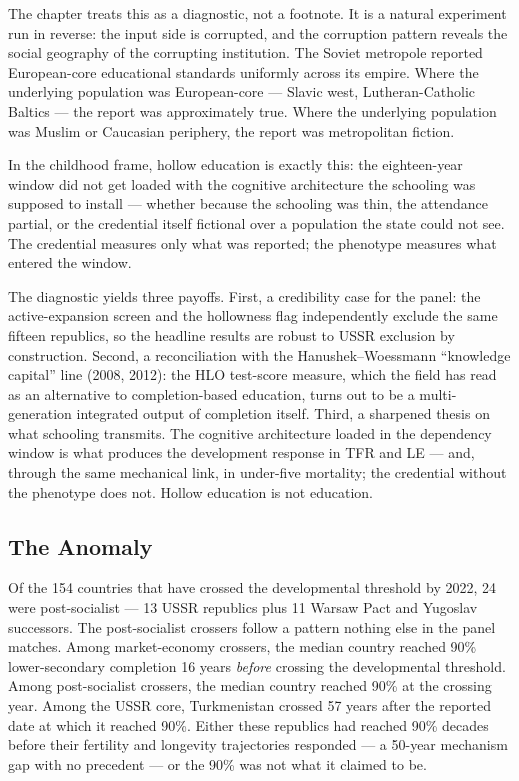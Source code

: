 \documentclass[12pt,letterpaper]{article}
\begin{document}
The chapter treats this as a diagnostic, not a footnote. It is a
natural experiment run in reverse: the input side is corrupted, and
the corruption pattern reveals the social geography of the corrupting
institution. The Soviet metropole reported European-core educational
standards uniformly across its empire. Where the underlying
population was European-core --- Slavic west, Lutheran-Catholic
Baltics --- the report was approximately true. Where the underlying
population was Muslim or Caucasian periphery, the report was
metropolitan fiction.

In the childhood frame, hollow education is exactly this: the
eighteen-year window did not get loaded with the cognitive
architecture the schooling was supposed to install --- whether
because the schooling was thin, the attendance partial, or the
credential itself fictional over a population the state could not
see. The credential measures only what was reported; the phenotype
measures what entered the window.

The diagnostic yields three payoffs. First, a credibility case for
the panel: the active-expansion screen and the hollowness flag
independently exclude the same fifteen republics, so the headline
results are robust to USSR exclusion by construction. Second, a
reconciliation with the
Hanushek--Woessmann ``knowledge capital'' line (2008, 2012): the HLO
test-score measure, which the field has read as an alternative to
completion-based education, turns out to be a multi-generation
integrated output of completion itself. Third, a sharpened thesis on
what schooling transmits. The cognitive architecture loaded in the
dependency window is what produces the development response in TFR
and LE --- and, through the same mechanical link, in under-five
mortality; the credential without the phenotype does not. Hollow
education is not education.

\subsection{The Anomaly}\label{the-anomaly}

Of the 154 countries that have crossed the developmental threshold
by 2022, 24 were post-socialist --- 13 USSR republics plus 11 Warsaw
Pact and Yugoslav successors. The post-socialist crossers follow a
pattern nothing else in the panel matches. Among market-economy
crossers, the median country reached 90\% lower-secondary completion
16 years \emph{before} crossing the developmental threshold. Among
post-socialist crossers, the median country reached 90\% at the
crossing year. Among the USSR core, Turkmenistan crossed 57 years
after the reported date at which it reached 90\%. Either these
republics had reached 90\% decades before their fertility and
longevity trajectories responded --- a 50-year mechanism gap with no
precedent --- or the 90\% was not what it claimed to be.
\end{document}
